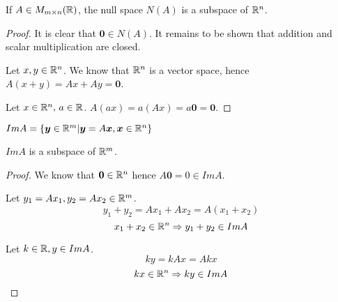 \documentclass[a4paper,10pt]{article}
\begin{document}
\begin{prop}
	If $A \in M_{m \times n}(\mathbb{R})$, the null space $N(A)$ is a
	subspace of $\mathbb{R}^n$.
\end{prop}

\begin{proof}
	It is clear that $\bm{0} \in N(A)$. It remains to be shown
	that addition and scalar multiplication are closed.

	Let $x,y \in \mathbb{R}^n$. We know that $\mathbb{R}^n$ is a vector space,
	hence $A(x+y) = Ax + Ay = \bm{0}$.

	Let $x \in \mathbb{R}^n, \, a \in \mathbb{R}$. $A(ax) = a(Ax) = a\bm{0} = \bm{0}$.
\end{proof}

\begin{defn}
	$Im A = \{ \bm{y} \in \mathbb{R}^m | \bm{y} = A\bm{x}, \bm{x} \in \mathbb{R}^n \}$
\end{defn}

\begin{prop}
	$Im A$ is a subspace of $\mathbb{R}^m$.
\end{prop}

\begin{proof}
	We know that $\bm{0} \in \mathbb{R}^n$ hence $A\bm{0} = 0 \in Im A$.

	Let $y_1 = Ax_1, y_2 = Ax_2 \in \mathbb{R}^m$.
	\[
		y_1 + y_2 = Ax_1 + Ax_2 = A(x_1 + x_2)
	\]
	\[
		x_1 + x_2 \in \mathbb{R}^n \Rightarrow y_1 + y_2 \in Im A
	\]

	Let $k \in \mathbb{R}, y \in Im A$.
	\[
		ky = kAx = Akx
	\]
	\[
		kx \in \mathbb{R}^n \Rightarrow ky \in Im A
	\]
\end{proof}
\end{document}
